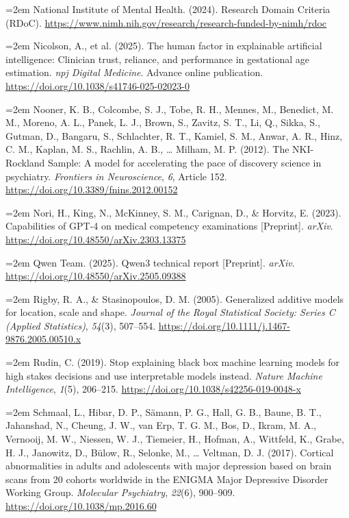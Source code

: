 \documentclass[11pt,a4paper,twoside]{article}
\begin{document}
\hangindent=2em National Institute of Mental Health. (2024). Research Domain Criteria (RDoC). \url{https://www.nimh.nih.gov/research/research-funded-by-nimh/rdoc}

\hangindent=2em Nicolson, A., et al. (2025). The human factor in explainable artificial intelligence: Clinician trust, reliance, and performance in gestational age estimation. \textit{npj Digital Medicine}. Advance online publication. \url{https://doi.org/10.1038/s41746-025-02023-0}

\hangindent=2em Nooner, K. B., Colcombe, S. J., Tobe, R. H., Mennes, M., Benedict, M. M., Moreno, A. L., Panek, L. J., Brown, S., Zavitz, S. T., Li, Q., Sikka, S., Gutman, D., Bangaru, S., Schlachter, R. T., Kamiel, S. M., Anwar, A. R., Hinz, C. M., Kaplan, M. S., Rachlin, A. B., \ldots{} Milham, M. P. (2012). The NKI-Rockland Sample: A model for accelerating the pace of discovery science in psychiatry. \textit{Frontiers in Neuroscience}, \textit{6}, Article 152. \url{https://doi.org/10.3389/fnins.2012.00152}

\hangindent=2em Nori, H., King, N., McKinney, S. M., Carignan, D., \& Horvitz, E. (2023). Capabilities of GPT-4 on medical competency examinations [Preprint]. \textit{arXiv}. \url{https://doi.org/10.48550/arXiv.2303.13375}

\hangindent=2em Qwen Team. (2025). Qwen3 technical report [Preprint]. \textit{arXiv}. \url{https://doi.org/10.48550/arXiv.2505.09388}

\hangindent=2em Rigby, R. A., \& Stasinopoulos, D. M. (2005). Generalized additive models for location, scale and shape. \textit{Journal of the Royal Statistical Society: Series C (Applied Statistics)}, \textit{54}(3), 507--554. \url{https://doi.org/10.1111/j.1467-9876.2005.00510.x}

\hangindent=2em Rudin, C. (2019). Stop explaining black box machine learning models for high stakes decisions and use interpretable models instead. \textit{Nature Machine Intelligence}, \textit{1}(5), 206--215. \url{https://doi.org/10.1038/s42256-019-0048-x}

\hangindent=2em Schmaal, L., Hibar, D. P., Sämann, P. G., Hall, G. B., Baune, B. T., Jahanshad, N., Cheung, J. W., van Erp, T. G. M., Bos, D., Ikram, M. A., Vernooij, M. W., Niessen, W. J., Tiemeier, H., Hofman, A., Wittfeld, K., Grabe, H. J., Janowitz, D., Bülow, R., Selonke, M., \ldots{} Veltman, D. J. (2017). Cortical abnormalities in adults and adolescents with major depression based on brain scans from 20 cohorts worldwide in the ENIGMA Major Depressive Disorder Working Group. \textit{Molecular Psychiatry}, \textit{22}(6), 900--909. \url{https://doi.org/10.1038/mp.2016.60}
\end{document}
